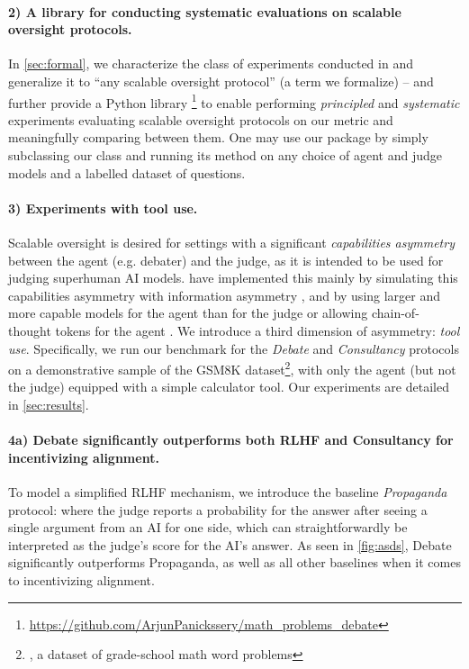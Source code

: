 
\paragraph{2) A library for conducting systematic evaluations on scalable oversight protocols.} In \cref{sec:formal}, we characterize the class of experiments conducted in \previouswork{} and generalize it to ``any scalable oversight protocol'' (a term we formalize) -- and further provide a Python library \solib{}\footnote{\url{https://github.com/ArjunPanickssery/math_problems_debate}} to enable performing \emph{principled} and \emph{systematic} experiments evaluating scalable oversight protocols on our metric and meaningfully comparing between them. One may use our package by simply subclassing our \Protocol{} class and running its \Protocolexp{} method on any choice of agent and judge models and a labelled dataset of questions.%

\paragraph{3) Experiments with tool use.} Scalable oversight is desired for settings with a significant \emph{capabilities asymmetry} between the agent (e.g. debater) and the judge, as it is intended to be used for judging superhuman AI models. \Previouswork{} have implemented this mainly by simulating this capabilities asymmetry with information asymmetry \citep{radhakrishnanAnthropicFall20232023,khanDebatingMorePersuasive2024}, and by using larger and more capable models for the agent than for the judge or allowing chain-of-thought tokens for the agent \citep{kentonScalableOversightWeak2024}. We introduce a third dimension of asymmetry: \emph{tool use}. Specifically, we run our benchmark for the \emph{Debate} and \emph{Consultancy} protocols on a demonstrative sample of the GSM8K dataset\footnote{\citet{cobbe2021gsm8k}, a dataset of grade-school math word problems}, with only the agent (but not the judge) equipped with a simple calculator tool. Our experiments are detailed in \cref{sec:results}.

\paragraph{4a) Debate significantly outperforms both RLHF and Consultancy for incentivizing alignment.} To model a simplified RLHF mechanism, we introduce the baseline \emph{Propaganda} protocol: where the judge reports a probability for the answer after seeing a single argument from an AI for one side, which can straightforwardly be interpreted as the judge's score for the AI's answer. As seen in \cref{fig:asds}, Debate significantly outperforms Propaganda, as well as all other baselines when it comes to incentivizing alignment. %

